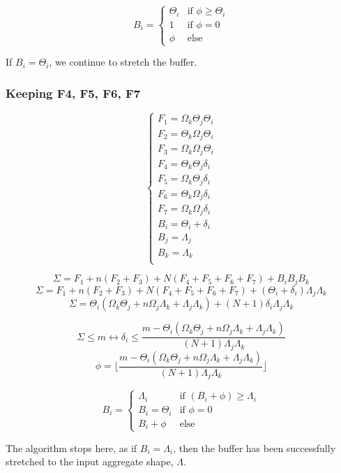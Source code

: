 \documentclass[conference]{IEEEtran}
\begin{document}
$$B_i = \begin{cases}
  \Theta_i & \textrm{if }\phi \geq \Theta_i \\
  1 & \textrm{if }\phi = 0 \\
  \phi & \textrm{else}
\end{cases}$$

If $B_i=\Theta_i$, we continue to stretch the buffer.

\subsubsection{Keeping F4, F5, F6, F7}

$$\begin{cases}
  F_1 = \Omega_k\Theta_j\Theta_i \\
  F_2 = \Theta_k\Omega_j\Theta_i \\
  F_3 = \Omega_k\Omega_j\Theta_i \\
  F_4 = \Theta_k\Theta_j\delta_i \\
  F_5 = \Omega_k\Theta_j\delta_i \\
  F_6 = \Theta_k\Omega_j\delta_i \\
  F_7 = \Omega_k\Omega_j\delta_i \\
  B_i = \Theta_i + \delta_i \\
  B_j = \Lambda_j\\
  B_k = \Lambda_k\\
\end{cases}$$

$$\Sigma = F_1 + n(F_2 + F_3) + N(F_4 + F_5 + F_6 + F_7) + B_iB_jB_k$$
$$\Sigma = F_1 + n(F_2 + F_3) + N(F_4 + F_5 + F_6 + F_7) + (\Theta_i + \delta_i)\Lambda_j\Lambda_k$$
$$\Sigma = \Theta_i(\Omega_k\Theta_j + n\Omega_j\Lambda_k + \Lambda_j\Lambda_k) + (N+1)\delta_i\Lambda_j\Lambda_k$$

$$\Sigma \leq m \leftrightarrow \delta_i \leq \frac{m-\Theta_i(\Omega_k\Theta_j + n\Omega_j\Lambda_k + \Lambda_j\Lambda_k)}{(N+1)\Lambda_j\Lambda_k}$$
$$\phi = \lfloor \frac{m-\Theta_i(\Omega_k\Theta_j + n\Omega_j\Lambda_k + \Lambda_j\Lambda_k)}{(N+1)\Lambda_j\Lambda_k} \rfloor$$

$$B_i = \begin{cases}
  \Lambda_i & \textrm{if }(B_i+\phi) \geq \Lambda_i \\
  B_i = \Theta_i & \textrm{if }\phi = 0 \\
  B_i+\phi & \textrm{else}
\end{cases}$$

The algorithm stops here, as if $B_i=\Lambda_i$, then the buffer has been
successfully stretched to the input aggregate shape, $\Lambda$.
\end{document}
